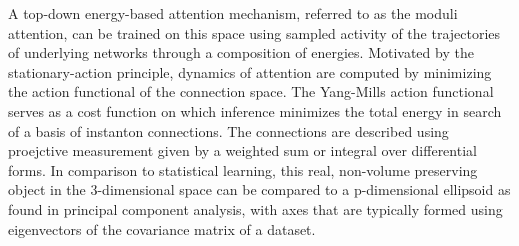 \documentclass{article}
\begin{document}
A top-down energy-based attention mechanism, referred to as the moduli attention, can be trained on this space using sampled activity of the trajectories of underlying networks through a composition of energies. Motivated by the stationary-action principle, dynamics of attention are computed by minimizing the action functional of the connection space. The Yang-Mills action functional serves as a cost function on which inference minimizes the total energy in search of a basis of instanton connections. The connections are described using proejctive measurement given by a weighted sum or integral over differential forms. In comparison to statistical learning, this real, non-volume preserving object in the 3-dimensional space can be compared to a p-dimensional ellipsoid as found in principal component analysis, with axes that are typically formed using eigenvectors of the covariance matrix of a dataset. 

\end{document}
